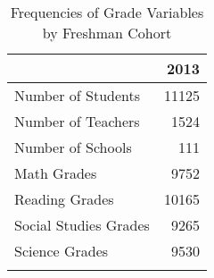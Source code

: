 \begin{table}

\caption{\label{tab:table_freq}Frequencies of Grade Variables by Freshman Cohort}
\centering
\begin{tabular}[t]{lr}
\toprule{}
  & 2013\\
\midrule{}
Number of Students & 11125\\
Number of Teachers & 1524\\
Number of Schools & 111\\
\addlinespace
Math Grades & 9752\\
Reading Grades & 10165\\
Social Studies Grades & 9265\\
Science Grades & 9530\\
\bottomrule{}
\end{tabular}
\end{table}
